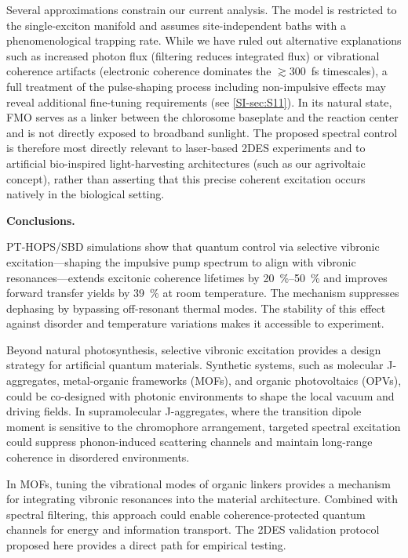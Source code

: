 \documentclass[journal=jpcl,manuscript=letter]{achemso}
\begin{document}
Several approximations constrain our current analysis. The model is restricted to the single-exciton manifold and assumes site-independent baths with a phenomenological trapping rate. While we have ruled out alternative explanations such as increased photon flux (filtering reduces integrated flux) or vibrational coherence artifacts (electronic coherence dominates the $\gtrsim$\SI{300}{\femto\second} timescales), a full treatment of the pulse-shaping process including non-impulsive effects may reveal additional fine-tuning requirements (see \cref{SI-sec:S11}). In its natural state, FMO serves as a linker between the chlorosome baseplate and the reaction center and is not directly exposed to broadband sunlight.\cite{Blankenship2011} The proposed spectral control is therefore most directly relevant to laser-based 2DES experiments and to artificial bio-inspired light-harvesting architectures (such as our agrivoltaic concept), rather than asserting that this precise coherent excitation occurs natively in the biological setting.

\textbf{Conclusions.}

PT-HOPS/SBD simulations show that quantum control via selective vibronic excitation---shaping the impulsive pump spectrum to align with vibronic resonances---extends excitonic coherence lifetimes by \SIrange{20}{50}{\percent} and improves forward transfer yields by \SI{39}{\percent} at room temperature. The mechanism suppresses dephasing by bypassing off-resonant thermal modes. The stability of this effect against disorder and temperature variations makes it accessible to experiment.

Beyond natural photosynthesis, selective vibronic excitation provides a design strategy for artificial quantum materials. Synthetic systems, such as molecular J-aggregates, metal-organic frameworks (MOFs), and organic photovoltaics (OPVs), could be co-designed with photonic environments to shape the local vacuum and driving fields. In supramolecular J-aggregates, where the transition dipole moment is sensitive to the chromophore arrangement, targeted spectral excitation could suppress phonon-induced scattering channels and maintain long-range coherence in disordered environments.

In MOFs, tuning the vibrational modes of organic linkers provides a mechanism for integrating vibronic resonances into the material architecture. Combined with spectral filtering, this approach could enable coherence-protected quantum channels for energy and information transport. The 2DES validation protocol proposed here provides a direct path for empirical testing.
\end{document}
